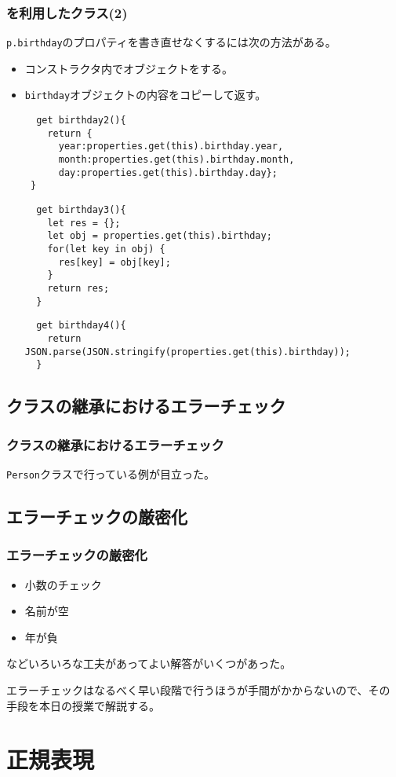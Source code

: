 \begin{frame}[containsverbatim]
 \frametitle{を利用したクラス(2)}
 \texttt{p.birthday}のプロパティを書き直せなくするには次の方法がある。
 \begin{itemize}
	\item コンストラクタ内でオブジェクトをする。
	\item \texttt{birthday}オブジェクトの内容をコピーして返す。
\begin{Verbatim}
  get birthday2(){
    return {
      year:properties.get(this).birthday.year,
      month:properties.get(this).birthday.month,
      day:properties.get(this).birthday.day};
 }
\end{Verbatim}
\begin{Verbatim}
  get birthday3(){
    let res = {};
    let obj = properties.get(this).birthday;
    for(let key in obj) {
      res[key] = obj[key];
    }
    return res;
  }
\end{Verbatim}
\begin{Verbatim}
  get birthday4(){
    return JSON.parse(JSON.stringify(properties.get(this).birthday));
  }
\end{Verbatim}
 \end{itemize}
\end{frame}
	\subsection{クラスの継承におけるエラーチェック}
\begin{frame}
 \frametitle{クラスの継承におけるエラーチェック}
 \texttt{Person}クラスで行っている例が目立った。
\end{frame}
\subsection{エラーチェックの厳密化}
\begin{frame}
 \frametitle{エラーチェックの厳密化}
\begin{itemize}
 \item 小数のチェック
 \item 名前が空
 \item 年が負
\end{itemize}
 などいろいろな工夫があってよい解答がいくつがあった。

 エラーチェックはなるべく早い段階で行うほうが手間がかからないので、その
 手段を本日の授業で解説する。
\end{frame}
 \section{正規表現}
